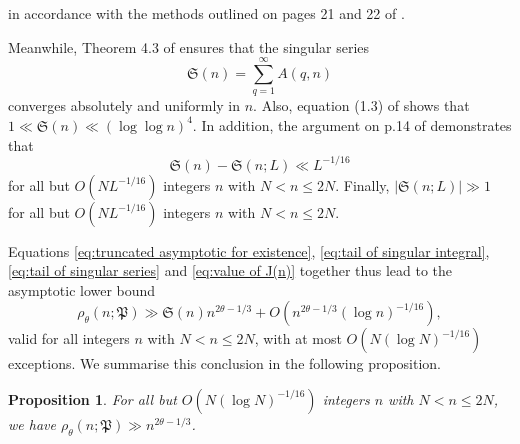 \documentclass[12pt,english,reqno]{amsart}
\theoremstyle{definition}
\theoremstyle{remark}
\numberwithin{equation}{section}
\numberwithin{equation}{section}
\numberwithin{figure}{section}
\theoremstyle{plain}
\theoremstyle{plain}
\newtheorem{prop}[thm]{Proposition}
\theoremstyle{plain}
\theoremstyle{plain}
\numberwithin{equation}{section}
\numberwithin{thm}{section}
\begin{document}
in accordance with the methods outlined on pages 21 and 22 of \cite{davenport2005}.
\par Meanwhile, Theorem 4.3 of \cite{vaughan1997} ensures that the singular
series
\begin{equation}
\mathfrak{S}(n)=\sum_{q=1}^{\infty}A(q,n)\label{eq:singular series}\end{equation}
converges absolutely and uniformly in $n$. Also, equation (1.3) of
\cite{kawada1996} shows that $1\ll\mathfrak{S}(n)\ll(\log\log n)^{4}$.
In addition, the argument on p.14 of \cite{BrudernWooley2009} demonstrates
that
\begin{equation}
\mathfrak{S}(n)-\mathfrak{S}(n;L)\ll L^{-1/16}\label{eq:tail of singular series}\end{equation}
for all but $O(NL^{-1/16})$ integers $n$ with $N<n\leq2N$. Finally,
$|\mathfrak{S}(n;L)|\gg1$ for all but $O(NL^{-1/16})$ integers $n$
with $N<n\leq2N$. 
\par Equations \eqref{eq:truncated asymptotic for existence}, \eqref{eq:tail of singular integral},
\eqref{eq:tail of singular series} and \eqref{eq:value of J(n)}
together thus lead to the asymptotic lower bound
\begin{equation}
\rho_{\theta}(n;\mathfrak{P})\gg\mathfrak{S}(n)n^{2\theta-1/3}+O(n^{2\theta-1/3}(\log n)^{-1/16}),\label{eq:asymptotic for existence}\end{equation}
valid for all integers $n$ with $N<n\leq2N$, with at most $O(N(\log N)^{-1/16})$
exceptions. We summarise this conclusion in the following proposition.
\begin{prop}
\label{pro:major arc estimate for existence}For all but $O(N(\log N)^{-1/16})$
integers $n$ with $N<n\leq2N$, we have $\rho_{\theta}(n;\mathfrak{P})\gg n^{2\theta-1/3}$.
\end{prop}
\end{document}
